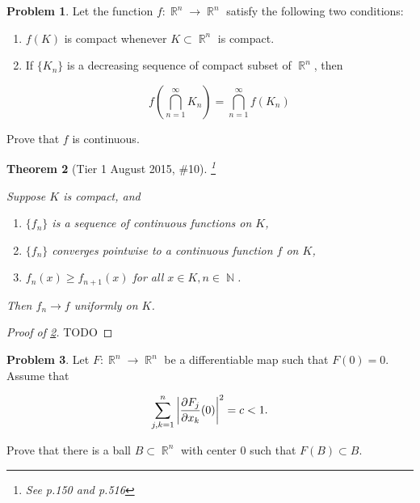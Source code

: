 \documentclass[english]{article}
\DeclareMathOperator{\R}{\mathbb{R}}
\DeclareMathOperator{\N}{\mathbb{N}}
\newtheorem{theorem}{Theorem} %
\theoremstyle{definition}
\newtheorem{problem}[theorem]{Problem}
\begin{document}
\begin{problem}
    \label{prob:function_of_intersections}
    Let the function $f: \R^n \to \R^n$ satisfy the following two conditions:
    
    \begin{enumerate}
        \item \label{enum:prob:function_of_intersections_1} $f(K)$ is compact whenever $K \subset \R^n$ is compact.
        \item \label{enum:prob:function_of_intersections_2} If $\{K_n\}$ is a decreasing sequence of compact subset of $\R^n$, then 
        
        \[
            f\left(\bigcap_{n = 1}^{\infty} K_n \right) = \bigcap_{n = 1}^{\infty} f(K_n)
        \]
    \end{enumerate}

    Prove that $f$ is continuous.
\end{problem}

\begin{theorem}[Tier 1 August 2015, \#10] \footnote{See \cite{rudin} p.150 and p.516}
    \label{thm:unif_convergence}

    Suppose $K$ is compact, and 
    \begin{enumerate}
        \item \label{enum:thm:unif_convergence_1} $\{f_n\}$ is a sequence of continuous functions on $K$,
        \item \label{enum:thm:unif_convergence_2} $\{f_n\}$ converges pointwise to a continuous function $f$ on $K$,
        \item \label{enum:thm:unif_convergence_3} $f_n(x) \geq f_{n + 1}(x)$ for all $x \in K, n \in \N$.
    \end{enumerate}

    Then $f_n \to f$ uniformly on $K$.
\end{theorem}

\begin{proof}[Proof of \cref{thm:unif_convergence}]
    TODO
\end{proof}

\begin{problem}
    \label{prob:ball_at_origin}
    Let $F: \R^n \to \R^n$ be a differentiable map such that $F(0) = 0$. Assume that 

    \[
      \sum_{j, k = 1}^n \left| {\partial F_j \over \partial x_k} (0) \right|^2 = c < 1.
    \]

    Prove that there is a ball $B \subset \R^n$ with center 0 such that $F(B) \subset B$.
\end{problem}
\end{document}
